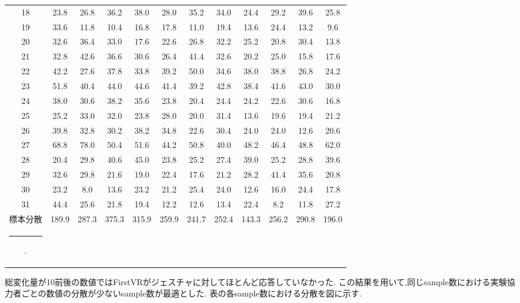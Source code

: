 \documentclass{ltjsreport}
\makeatletter
\def\Hline{
  \noalign{\ifnum0=`}\fi\hrule \@height 3.\arrayrulewidth \futurelet
  \reserved@a\@xhline}
\makeatother
\begin{document}
\begin{table}[H]
\begin{center}
\begin{tabular}{c|ccccccccccc}
			18 & 23.8 & 26.8 & 36.2 & 38.0 & 28.0 & 35.2 & 34.0 & 24.4 & 29.2 & 39.6 & 25.8 \\
			19 & 33.6 & 11.8 & 10.4 & 16.8 & 17.8 & 11.0 & 19.4 & 13.6 & 24.4 & 13.2 & 9.6 \\
			20 & 32.6 & 36.4 & 33.0 & 17.6 & 22.6 & 26.8 & 32.2 & 25.2 & 20.8 & 30.4 & 13.8 \\
			21 & 32.8 & 42.6 & 36.6 & 30.6 & 26.4 & 41.4 & 32.6 & 20.2 & 25.0 & 15.8 & 17.6 \\
			22 & 42.2 & 27.6 & 37.8 & 33.8 & 39.2 & 50.0 & 34.6 & 38.0 & 38.8 & 26.8 & 24.2 \\
			23 & 51.8 & 40.4 & 44.0 & 44.6 & 41.4 & 39.2 & 42.8 & 38.4 & 41.6 & 43.0 & 30.0 \\
			24 & 38.0 & 30.6 & 38.2 & 35.6 & 23.8 & 20.4 & 24.4 & 24.2 & 22.6 & 30.6 & 16.8 \\
			25 & 25.2 & 33.0 & 32.0 & 23.8 & 28.0 & 20.0 & 31.4 & 13.6 & 19.6 & 19.4 & 21.2 \\
			26 & 39.8 & 32.8 & 30.2 & 38.2 & 34.8 & 22.6 & 30.4 & 24.0 & 24.0 & 12.6 & 20.6 \\
			27 & 68.8 & 78.0 & 50.4 & 51.6 & 44.2 & 50.8 & 40.0 & 48.2 & 46.4 & 48.8 & 62.0 \\
			28 & 20.4 & 29.8 & 40.6 & 45.0 & 23.8 & 25.2 & 27.4 & 39.0 & 25.2 & 28.8 & 39.6 \\
			29 & 32.6 & 29.8 & 21.6 & 19.0 & 22.4 & 17.6 & 21.2 & 28.2 & 41.4 & 35.6 & 20.8 \\
			30 & 23.2 & 8.0 & 13.6 & 23.2 & 21.2 & 25.4 & 24.0 & 12.6 & 16.0 & 24.4 & 17.8 \\
			31 & 44.4 & 25.6 & 21.8 & 19.4 & 12.2 & 12.6 & 13.4 & 22.4 & 8.2 & 11.8 & 27.2 \\ \hline
			標本分散&189.9 & 287.3 & 375.3 & 315.9 & 259.9 & 241.7 & 252.4 & 143.3 & 256.2 & 290.8 & 196.0 \\ \Hline
			
		\end{tabular}
		\end{center}
		\end{table}
		\vspace{-5pt}

		総変化量が10前後の数値ではFirstVRがジェスチャに対してほとんど応答していなかった.
		この結果を用いて,同じsample数における実験協力者ごとの数値の分散が少ないsample数が最適とした.
\clearpage
		表の各sample数における分散を図に示す.
\end{document}
